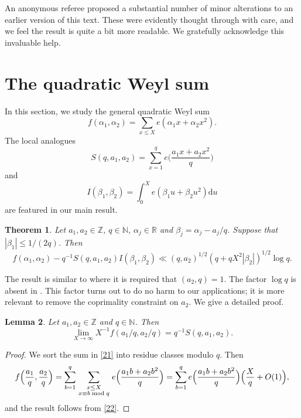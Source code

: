 \documentclass[reqno]{amsart}
\newcommand{\multsum}[2]{\sum_{{\scriptstyle #1}\atop {\scriptstyle #2}}}
\newcommand\dd{{\mathrm d}}
\newtheorem{thm}{Theorem}[section]
\newtheorem{lemma}[thm]{Lemma}
\numberwithin{equation}{section}
\begin{document}
An anonymous referee proposed a substantial number of minor alterations to an earlier version of this text. These were evidently thought through with care, and we feel the result is quite a bit more readable. We gratefully acknowledge this invaluable help.









\section{The quadratic Weyl sum}

In this section, we study the general quadratic Weyl sum
\begin{equation}\label{21} f(\alpha_1,\alpha_2) = \sum_{x\le X} e(\alpha_1 x+ \alpha_2 x^2). \end{equation}
The local analogues
\begin{equation}\label{22} S(q,a_1,a_2) = \sum_{x=1}^q e\Big(
\frac{a_1x+a_2 x^2}{q}\Big) \end{equation}
and
$$ I(\beta_1,\beta_2) = \int_0^X e(\beta_1 u+ \beta_2 u^2) \dd u $$
are featured in our main result. 

\begin{thm}\label{quadWeyl} Let $a_1,a_2\in\mathbb Z$, $q\in\mathbb N$, $\alpha_j\in\mathbb R$ and $\beta_j = \alpha_j-a_j/q$. Suppose that $|\beta_1|\le 1/(2q)$. Then
$$ f(\alpha_1,\alpha_2) - q^{-1}S(q,a_1,a_2)I(\beta_1,\beta_2) \ll (q,a_2)^{1/2} (q+qX^2|\beta_2|)^{1/2} \log q. $$
\end{thm}

The result is similar to \cite[Theorem 8]{gen} where it is required that $(a_2,q)=1$. The factor $\log q$ is absent in \cite{gen}. This factor turns out to do no harm to our applications; it is more relevant to remove the coprimality constraint on $a_2$. We give a detailed proof.

\begin{lemma}\label{L22} Let $a_1,a_2\in\mathbb Z$ and  $q\in\mathbb N$. Then
$$ \lim_{X\to\infty} X^{-1} f(a_1/q,a_2/q) = q^{-1}S(q,a_1,a_2). $$
\end{lemma}  

\begin{proof} We sort the sum in \eqref{21} into residue classes modulo $q$. Then
$$ f\Big(\frac{a_1}q, \frac{a_2}q\Big) = \sum_{b=1}^q \multsum{x\le X}{x\equiv b\bmod q} e\Big(\frac{a_1 b+a_2b^2}q\Big) =   \sum_{b=1}^q e\Big(\frac{a_1 b+a_2b^2}q\Big) \Big(\frac{X}{q} +O(1)\Big), $$
and the result follows from \eqref{22}.\end{proof}
\end{document}

